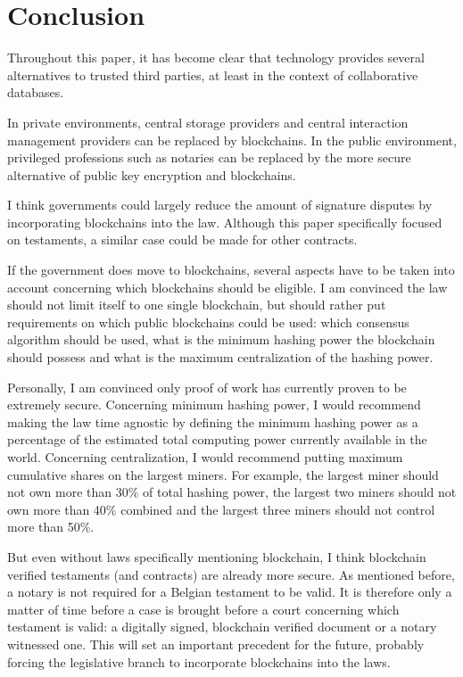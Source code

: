 \chapter{Conclusion}

Throughout this paper, it has become clear that technology provides several alternatives to trusted third parties, at least in the context of collaborative databases. 

In  private environments, central storage providers and central interaction management providers can be replaced by blockchains. In the public environment, privileged professions such as notaries can be replaced by the more secure alternative of public key encryption and blockchains.

I think governments could largely reduce the amount of signature disputes by incorporating blockchains into the law. Although this paper specifically focused on testaments, a similar case could be made for other contracts. 

If the government does move to blockchains, several aspects have to be taken into account concerning which blockchains should be eligible. I am convinced the law should not limit itself to one single blockchain, but should rather put requirements on which public blockchains could be used: which consensus algorithm should be used, what is the minimum hashing power the blockchain should possess and what is the maximum centralization of the hashing power. 

Personally, I am convinced only proof of work has currently proven to be extremely secure. Concerning minimum hashing power, I would recommend making the law time agnostic by defining the minimum hashing power as a percentage of the estimated total computing power currently available in the world. Concerning centralization, I would recommend putting maximum cumulative shares on the largest miners. For example, the largest miner should not own more than 30\% of total hashing power, the largest two miners should not own more than 40\% combined and the largest three miners should not control more than 50\%. 

But even without laws specifically mentioning blockchain, I think blockchain verified testaments (and contracts) are already more secure. As mentioned before, a notary is not required for a Belgian testament to be valid. It is therefore only a matter of time before a case is brought before a court concerning which testament is valid: a digitally signed, blockchain verified document or a notary witnessed one. This will set an important precedent for the future, probably forcing the legislative branch to incorporate blockchains into the laws.



